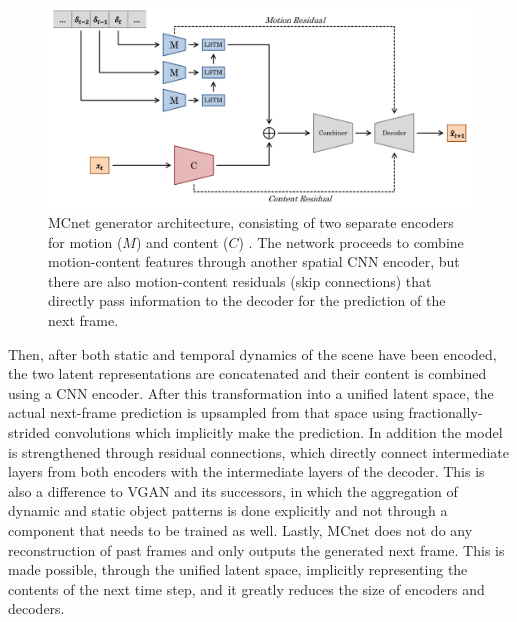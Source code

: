 \begin{figure}
	\centering
	\includegraphics[width=1\textwidth]{graphics/gan/mcnet/mcnet.pdf}
  \caption[MCnet generator architecture.]{MCnet generator architecture, consisting of two separate encoders for motion ($M$) and content ($C$) \cite{villegas2017decomposing}. The network proceeds to combine motion-content features through another spatial CNN encoder, but there are also motion-content residuals (skip connections) that directly pass information to the decoder for the prediction of the next frame.}
  \label{fig:mc_net}
\end{figure}

Then, after both static and temporal dynamics of the scene have been encoded, the two latent representations are concatenated and their content is combined using a CNN encoder. After this transformation into a unified latent space, the actual next-frame prediction is upsampled from that space using fractionally-strided convolutions which implicitly make the prediction. In addition the model is strengthened through residual connections, which directly connect intermediate layers from both encoders with the intermediate layers of the decoder. This is also a difference to VGAN and its successors, in which the aggregation of dynamic and static object patterns is done explicitly and not through a component that needs to be trained as well. Lastly, MCnet does not do any reconstruction of past frames and only outputs the generated next frame. This is made possible, through the unified latent space, implicitly representing the contents of the next time step, and it greatly reduces the size of encoders and decoders.

\pagebreak

